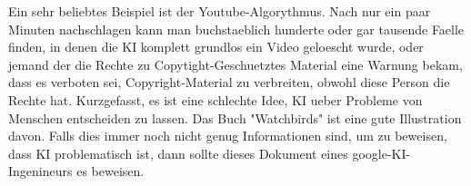 \documentclass{report}
\begin{document}
\newline 
Ein sehr beliebtes Beispiel ist der Youtube-Algorythmus. Nach nur ein paar Minuten nachschlagen kann man buchstaeblich hunderte oder gar tausende Faelle finden, in denen die KI komplett grundlos ein Video geloescht wurde, oder jemand der die Rechte zu Copytight-Geschuetztes Material eine Warnung bekam, dass es verboten sei, Copyright-Material zu verbreiten, obwohl diese Person die Rechte hat.
\newline
Kurzgefasst, es ist eine schlechte Idee, KI ueber Probleme von Menschen entscheiden zu lassen. Das Buch "Watchbirds" ist eine gute Illustration davon. Falls dies immer noch nicht genug Informationen sind, um zu beweisen, dass KI problematisch ist, dann sollte dieses
Dokument \citep{google-enginner-says-big-ai-sucks}
eines google-KI-Ingenineurs es beweisen.
\printbibliography
\end{document}
